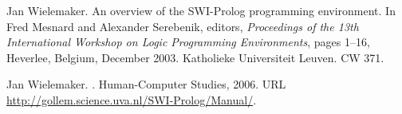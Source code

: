 \documentclass[draft]{llncs}%
\begin{document}
\begin{thebibliography}{10}
Jan Wielemaker.
\newblock An overview of the {SWI-Prolog} programming environment.
\newblock In Fred Mesnard and Alexander Serebenik, editors, {\em Proceedings of
  the 13th International Workshop on Logic Programming Environments}, pages
  1--16, Heverlee, Belgium, December 2003. Katholieke Universiteit Leuven.
\newblock CW 371.

Jan Wielemaker.
.
\newblock Human-Computer Studies, 2006.
\newblock URL \url{http://gollem.science.uva.nl/SWI-Prolog/Manual/}.

\end{thebibliography}

\fi
\end{document}
